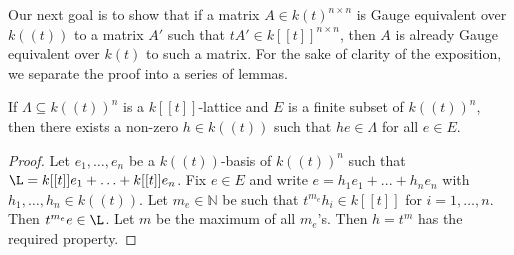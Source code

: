 \documentclass[a4paper, 11pt]{article}
\begin{document}
%
%



Our next goal is to show that if a matrix $A\in k(t)^{n\times n}$ is Gauge equivalent over $k((t))$ to a matrix $A'$ such that $tA'\in k[[t]]^{n\times n}$, then $A$ is already Gauge equivalent over $k(t)$ to such a matrix.
For the sake of clarity of the exposition, we separate the proof into a series of lemmas.





\begin{lemma}\label{lem:val}
	If $\Lambda\subseteq k((t))^n$ is a $k[[t]]$-lattice and $E$ is a finite subset of $k((t))^n$, then there exists a non-zero $h\in k((t))$ such that $he\in\Lambda$ for all $e\in E$.
\end{lemma}	
\begin{proof}
	Let $e_1,\ldots,e_n$ be a $k((t))$-basis of $k((t))^n$ such that $\L=k[[t]]e_1+\ldots+k[[t]]e_n$. Fix $e\in E$ and write $e = h_1e_1+...+h_ne_n$ with $h_1,\ldots,h_n\in k((t))$. Let $m_e\in\mathbb{N}$ be such that $t^{m_e}h_i\in k[[t]]$ for $i=1,\ldots,n$.	Then $t^{m_e}e\in\L$. Let $m$ be the maximum of all $m_e$'s. Then $h=t^m$ has the required property.
\end{proof}
\end{document}
